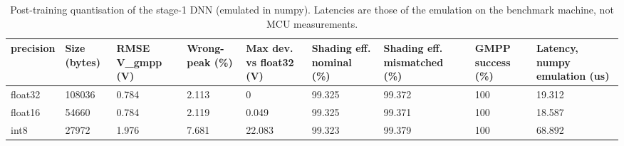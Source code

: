 \begin{table}[t]
\centering
\caption{Post-training quantisation of the stage-1 DNN (emulated in numpy). Latencies are those of the emulation on the benchmark machine, not MCU measurements.}
\label{tab:Table_Quant}
\small
\begin{tabular}{lllllllll}
\hline
precision & Size (bytes) & RMSE V\_gmpp (V) & Wrong-peak (\%) & Max dev. vs float32 (V) & Shading eff. nominal (\%) & Shading eff. mismatched (\%) & GMPP success (\%) & Latency, numpy emulation (us) \\
\hline
float32 & 108036 & 0.784 & 2.113 & 0 & 99.325 & 99.372 & 100 & 19.312 \\
float16 & 54660 & 0.784 & 2.119 & 0.049 & 99.325 & 99.371 & 100 & 18.587 \\
int8 & 27972 & 1.976 & 7.681 & 22.083 & 99.323 & 99.379 & 100 & 68.892 \\
\hline
\end{tabular}
\end{table}
